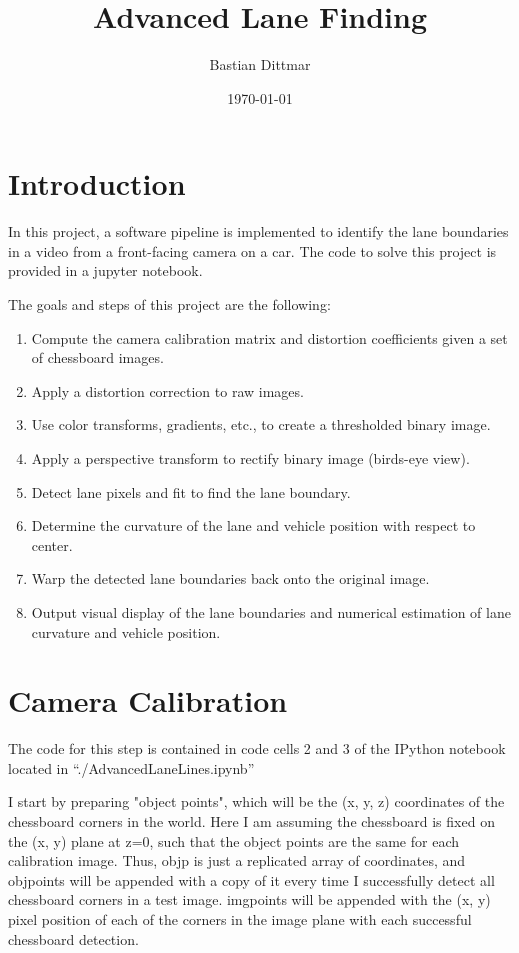 \documentclass[a4paper, 11pt, DIV=14]{scrartcl}
\author{Bastian Dittmar}
\date{\today}
\title{Advanced Lane Finding}
\begin{document}
\maketitle


\section{Introduction}
In this project, a software pipeline is implemented to identify the lane boundaries in a video from a front-facing camera on a car. The code to solve this project is provided in a jupyter notebook.

The goals and steps of this project are the following:
\begin{enumerate}
\item Compute the camera calibration matrix and distortion coefficients given a set of chessboard images.
\item Apply a distortion correction to raw images.
\item Use color transforms, gradients, etc., to create a thresholded binary image.
\item Apply a perspective transform to rectify binary image (birds-eye view).
\item Detect lane pixels and fit to find the lane boundary.
\item Determine the curvature of the lane and vehicle position with respect to center.
\item Warp the detected lane boundaries back onto the original image.
\item Output visual display of the lane boundaries and numerical estimation of lane curvature and vehicle position.
\end{enumerate}


\section{Camera Calibration}
\label{sec:camera_calibration}
The code for this step is contained in code cells 2 and 3 of the IPython notebook located in ``./AdvancedLaneLines.ipynb''

I start by preparing "object points", which will be the (x, y, z) coordinates of the chessboard corners in the world. Here I am assuming the chessboard is fixed on the (x, y) plane at z=0, such that the object points are the same for each calibration image. Thus, objp is just a replicated array of coordinates, and objpoints will be appended with a copy of it every time I successfully detect all chessboard corners in a test image. imgpoints will be appended with the (x, y) pixel position of each of the corners in the image plane with each successful chessboard detection.
\end{document}
